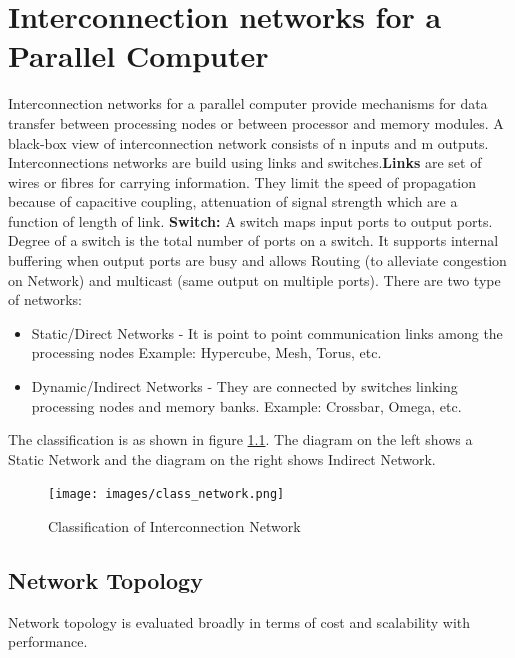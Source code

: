 \documentclass[12pt]{book}
\begin{document}
\chapter{Interconnection networks for a Parallel Computer}
Interconnection networks for a parallel computer provide mechanisms for data transfer between processing nodes or between
processor and memory modules. A black-box view of interconnection network consists of n inputs and m outputs. Interconnections networks are build using links and switches.\textbf{Links} are set of wires 
or fibres for carrying information. They limit the speed of propagation because of capacitive coupling, attenuation of signal strength 
which are a function of length of link. \textbf{Switch: }A switch maps input ports to output ports. Degree of a switch is the total number of ports on a switch.
It supports internal buffering when output ports are busy and allows Routing (to alleviate congestion on Network) and 
multicast (same output on multiple ports). There are two type of networks:
\begin{itemize}
    \item Static/Direct Networks - It is point to point communication links among the processing nodes Example: Hypercube, Mesh, Torus, etc.
    \item Dynamic/Indirect Networks - They are connected by switches linking processing nodes and memory banks. Example: Crossbar, Omega, etc.
\end{itemize}
The classification is as shown in figure \ref{fig:class_network}. The diagram on the left shows a Static Network and the diagram on the right shows Indirect Network.
\begin{figure}[H]
    \centering
    \texttt{[image: images/class\_network.png]}
    \caption{Classification of Interconnection Network}
    \label{fig:class_network}
\end{figure}

\section{Network Topology}
Network topology is evaluated broadly in terms of cost and scalability with performance.
\end{document}
